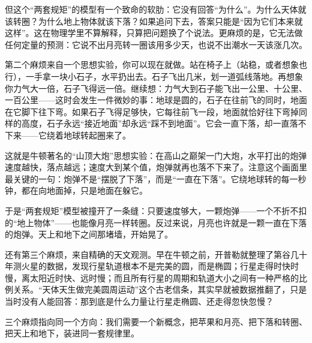 但这个“两套规矩”的模型有一个致命的软肋：它没有回答“为什么”。为什么天体就该转圈？为什么地上物体就该下落？如果追问下去，答案只能是“因为它们本来就这样”。这在物理学里不算解释，只算把问题换了个说法。更麻烦的是，它无法做任何定量的预测：它说不出月亮转一圈该用多少天，也说不出潮水一天该涨几次。

第二个麻烦来自一个思想实验，你可以现在就做。站在椅子上（站稳，或者想象也行），一手拿一块小石子，水平扔出去。石子飞出几米，划一道弧线落地。再想象你力气大一倍，石子飞得远一倍。继续想：力气大到石子能飞出一公里、十公里、一百公里——这时会发生一件微妙的事：地球是圆的，石子在往前飞的同时，地面在它脚下往下弯。如果石子飞得足够快，它每往前飞一段，地面就恰好往下弯掉同样的高度，石子永远“接近地面”却永远“踩不到地面”。它会一直下落，却一直落不下来——它绕着地球转起圈来了。

这就是牛顿著名的“山顶大炮”思想实验：在高山之巅架一门大炮，水平打出的炮弹速度越快，落点越远；速度大到某个值，炮弹就再也落不下来了。注意这个画面里最关键的一句：炮弹不是“摆脱了下落”，而是“一直在下落”。它绕地球转的每一秒钟，都在向地面掉，只是地面在躲它。

\begin{center}
\end{center}

于是“两套规矩”模型被撞开了一条缝：只要速度够大，一颗炮弹——一个不折不扣的“地上物体”——也能像月亮一样转圈。反过来说，月亮也许就是一颗一直在下落的炮弹。天上和地下之间那堵墙，开始晃了。

还有第三个麻烦，来自精确的天文观测。早在牛顿之前，开普勒就整理了第谷几十年测火星的数据，发现行星轨道根本不是完美的圆，而是椭圆；行星走得时快时慢，离太阳近时快、远时慢；而且所有行星的周期和轨道大小之间有一种严格的比例关系。“天体天生做完美圆周运动”这个古老信条，其实早就被数据推翻了，只是当时没有人能回答：那到底是什么力量让行星走椭圆、还走得忽快忽慢？

三个麻烦指向同一个方向：我们需要一个新概念，把苹果和月亮、把下落和转圈、把天上和地下，装进同一套规律里。


